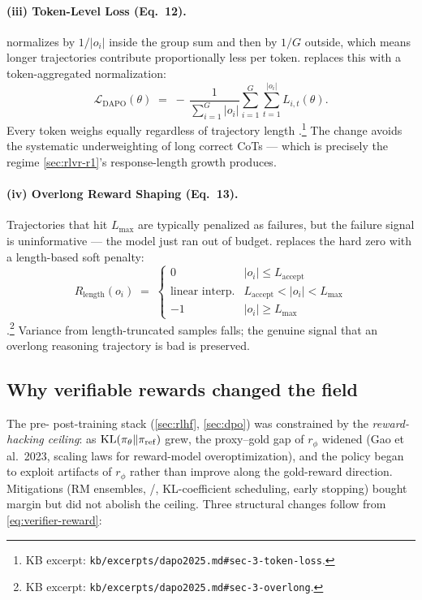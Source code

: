\paragraph{(iii) Token-Level Loss (Eq.\ 12).}  normalizes by
$1/|o_i|$ inside the group sum and then by $1/G$ outside, which means
longer trajectories contribute proportionally less per token. 
replaces this with a token-aggregated normalization:
\begin{equation}
\mathcal{L}_{\mathrm{DAPO}}(\theta) \;=\; -\,\frac{1}{\sum_{i=1}^{G} |o_i|} \sum_{i=1}^{G} \sum_{t=1}^{|o_i|} L_{i,t}(\theta).
\label{eq:dapo-tokenloss}
\end{equation}
Every token weighs equally regardless of trajectory length
\citep[Eq.\ 12]{dapo2025}.\footnote{KB excerpt:
\texttt{kb/excerpts/dapo2025.md\#sec-3-token-loss}.} The change avoids
the systematic underweighting of long correct CoTs — which is precisely
the regime \cref{sec:rlvr-r1}'s response-length growth produces.

\paragraph{(iv) Overlong Reward Shaping (Eq.\ 13).} Trajectories that
hit $L_{\max}$ are typically penalized as failures, but the failure
signal is uninformative — the model just ran out of budget. 
replaces the hard zero with a length-based soft penalty:
\begin{equation}
R_{\mathrm{length}}(o_i) \;=\; \begin{cases}
0 & |o_i| \le L_{\mathrm{accept}} \\
\text{linear interp.} & L_{\mathrm{accept}} < |o_i| < L_{\max} \\
-1 & |o_i| \ge L_{\max}
\end{cases}
\label{eq:dapo-overlong}
\end{equation}
\citep[Eq.\ 13]{dapo2025}.\footnote{KB excerpt:
\texttt{kb/excerpts/dapo2025.md\#sec-3-overlong}.} Variance from
length-truncated samples falls; the genuine signal that an overlong
reasoning trajectory is bad is preserved.

\subsection{Why verifiable rewards changed the field}
\label{sec:rlvr-why}

The pre- post-training stack (\cref{sec:rlhf}, \cref{sec:dpo}) was
constrained by the \emph{reward-hacking ceiling}: as
$\operatorname{KL}(\pi_\theta \| \pi_{\mathrm{ref}})$ grew, the proxy--gold gap of
$r_\phi$ widened (Gao et al.\ 2023, scaling laws for reward-model
overoptimization), and the policy began to
exploit artifacts of $r_\phi$ rather than improve along the gold-reward
direction. Mitigations (RM ensembles, /, KL-coefficient
scheduling, early stopping) bought margin but did not abolish the
ceiling. Three structural changes follow from \cref{eq:verifier-reward}:

